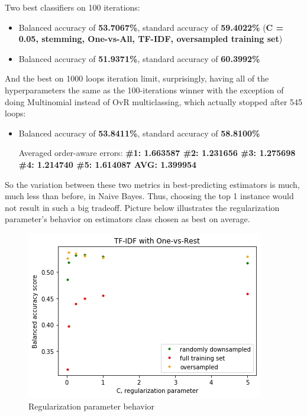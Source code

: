 \documentclass[letterpaper]{article}
\begin{document}
Two best classifiers on 100 iterations:

\begin{itemize}
    \item Balanced accuracy of \textbf{53.7067\%}, standard accuracy of \textbf{59.4022\%} 
    (\textbf{C = 0.05, stemming, One-vs-All, TF-IDF, oversampled training set})
    \item Balanced accuracy of \textbf{51.9371\%}, standard accuracy of \textbf{60.3992\%}
\end{itemize}

And the best on 1000 loops iteration limit, surprisingly, having all of the hyperparameters the same
as the 100-iterations winner with the exception of doing Multinomial instead of OvR multiclassing,
which actually stopped after 545 loops:
\begin{itemize}
    \item Balanced accuracy of \textbf{53.8411\%}, standard accuracy of \textbf{58.8100\%}
    
    Averaged order-aware errors:
    \textbf{\#1: 1.663587	\#2: 1.231656	\#3: 1.275698	\#4: 1.214740	\#5: 1.614087	AVG: 1.399954}
\end{itemize}

So the variation between these two metrics in best-predicting estimators is much, much less than before, in Naive Bayes.
Thus, choosing the top 1 instance would not result in such a big  tradeoff.
Picture below illustrates the regularization parameter's behavior on estimators class chosen as best on average.

\begin{figure}[H]
    \centering
    \includegraphics[scale=0.7]{logreg-behavior.png}
    \caption{Regularization parameter behavior}
\end{figure}
\end{document}
